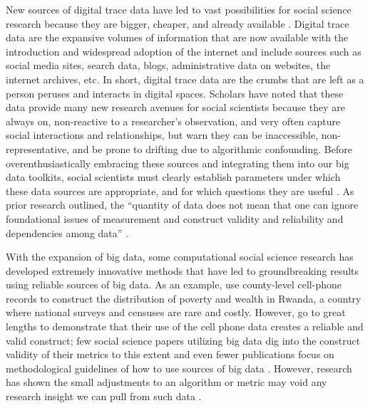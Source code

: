 New sources of digital trace data have led to vast possibilities for social
science research because they are bigger, cheaper, and already available
\citep{kingEnsuringDataRichFuture2011,lazerComputationalSocialScience2009,salganikBitBitSocial2017}.
Digital trace data are the expansive volumes of information that are now
available with the introduction and widespread adoption of the internet and
include sources such as social media sites, search data, blogs, administrative
data on websites, the internet archives, etc. In short, digital trace data are
the crumbs that are left as a person peruses and interacts in digital spaces.
Scholars have noted that these data provide many new research avenues for social
scientists because they are always on, non-reactive to a researcher's
observation, and very often capture social interactions and relationships, but
warn they can be inaccessible, non-representative, and be prone to drifting due
to algorithmic confounding\citep{salganikBitBitSocial2017}. Before
overenthusiastically embracing these sources and integrating them into our big
data toolkits, social scientists must clearly establish parameters under which
these data sources are appropriate, and for which questions they are useful
\citep{bailCulturalEnvironmentMeasuring2014, lazerParableGoogleFlu2014}. As
prior research outlined, the ``quantity of data does not mean that one can ignore
foundational issues of measurement and construct validity and reliability and
dependencies among data'' \citep[p. 1203]{lazerParableGoogleFlu2014}.

With the expansion of big data, some computational social science research has
developed extremely innovative methods that have led to groundbreaking results
using reliable sources of big data. As an
example,\citet{blumenstockPredictingPovertyWealth2015} use county-level
cell-phone records to construct the distribution of poverty and wealth in
Rwanda, a country where national surveys and censuses are rare and costly.
However, \citet{blumenstockPredictingPovertyWealth2015} go to great lengths to
demonstrate that their use of the cell phone data creates a reliable and valid
construct; few social science papers utilizing big data dig into the construct
validity of their metrics to this extent and even fewer publications focus on
methodological guidelines of how to use sources of big data \citep[For
exceptions, see ][]{asseoTrackingCOVID19Using2020,
stilesAssessingCriterionValidity2018}. However, research has shown the small
adjustments to an algorithm or metric may void any research insight we can pull
from such data \citep{lazerParableGoogleFlu2014}.


